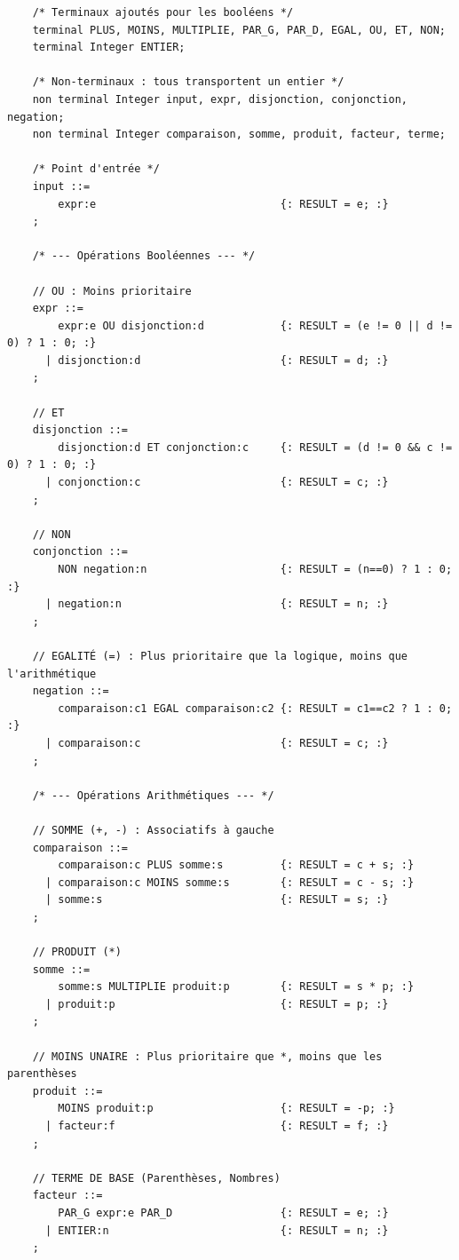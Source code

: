 \documentclass[correction]{td}
\begin{document}
\begin{correction}
  \begin{lstlisting}
    /* Terminaux ajoutés pour les booléens */
    terminal PLUS, MOINS, MULTIPLIE, PAR_G, PAR_D, EGAL, OU, ET, NON;
    terminal Integer ENTIER;
     
    /* Non-terminaux : tous transportent un entier */
    non terminal Integer input, expr, disjonction, conjonction, negation;
    non terminal Integer comparaison, somme, produit, facteur, terme;
          
    /* Point d'entrée */
    input ::=
        expr:e                             {: RESULT = e; :}
    ;
     
    /* --- Opérations Booléennes --- */
     
    // OU : Moins prioritaire
    expr ::=
        expr:e OU disjonction:d            {: RESULT = (e != 0 || d != 0) ? 1 : 0; :}
      | disjonction:d                      {: RESULT = d; :}
    ;
     
    // ET
    disjonction ::=
        disjonction:d ET conjonction:c     {: RESULT = (d != 0 && c != 0) ? 1 : 0; :}
      | conjonction:c                      {: RESULT = c; :}
    ;
     
    // NON
    conjonction ::=
        NON negation:n                     {: RESULT = (n==0) ? 1 : 0; :}
      | negation:n                         {: RESULT = n; :}
    ;
     
    // EGALITÉ (=) : Plus prioritaire que la logique, moins que l'arithmétique
    negation ::=
        comparaison:c1 EGAL comparaison:c2 {: RESULT = c1==c2 ? 1 : 0; :}
      | comparaison:c                      {: RESULT = c; :}
    ;
     
    /* --- Opérations Arithmétiques --- */
     
    // SOMME (+, -) : Associatifs à gauche
    comparaison ::=
        comparaison:c PLUS somme:s         {: RESULT = c + s; :}
      | comparaison:c MOINS somme:s        {: RESULT = c - s; :}
      | somme:s                            {: RESULT = s; :}
    ;
     
    // PRODUIT (*)
    somme ::=
        somme:s MULTIPLIE produit:p        {: RESULT = s * p; :}
      | produit:p                          {: RESULT = p; :}
    ;
     
    // MOINS UNAIRE : Plus prioritaire que *, moins que les parenthèses
    produit ::=
        MOINS produit:p                    {: RESULT = -p; :}
      | facteur:f                          {: RESULT = f; :}
    ;
     
    // TERME DE BASE (Parenthèses, Nombres)
    facteur ::=
        PAR_G expr:e PAR_D                 {: RESULT = e; :}
      | ENTIER:n                           {: RESULT = n; :}
    ;
  \end{lstlisting}
\end{correction}
\end{document}
